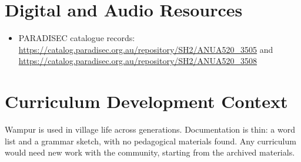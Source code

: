 \documentclass[12pt]{article}
\begin{document}
\section{Digital and Audio Resources}
\begin{itemize}
\item PARADISEC catalogue records: \url{https://catalog.paradisec.org.au/repository/SH2/ANUA520_3505} and \url{https://catalog.paradisec.org.au/repository/SH2/ANUA520_3508}
\end{itemize}
\section{Curriculum Development Context}
Wampur is used in village life across generations. Documentation is thin: a word list and a grammar sketch, with no pedagogical materials found. Any curriculum would need new work with the community, starting from the archived materials.
\end{document}
